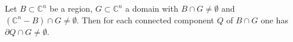 Let $B \subset \mathbb{C}^n$ be a region, $G \subset \mathbb{C}^n$ a domain with $B \cap G \neq \emptyset$ and $(\mathbb{C}^n - B) \cap G \neq \emptyset$. Then for each connected component $Q$ of $B \cap G$ one has $\partial Q \cap G \neq \emptyset$.
